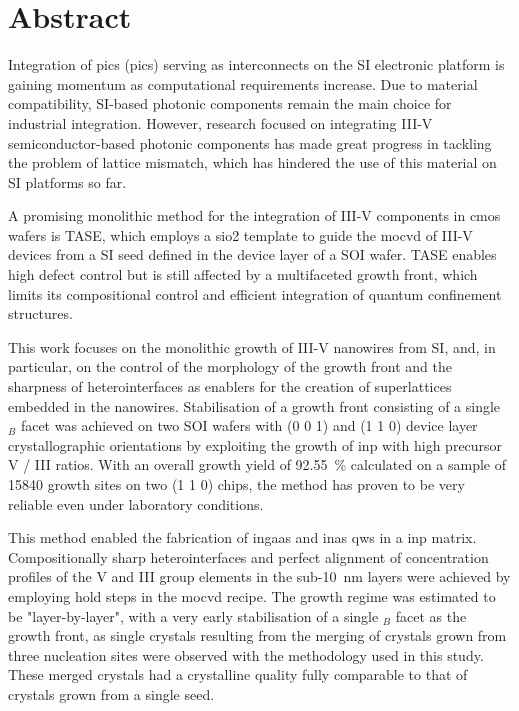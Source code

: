 \chapter{Abstract}

Integration of \acl{pic}s (\acs{pic}s) serving as interconnects on the \acl{SI} electronic platform is gaining momentum as computational requirements increase. Due to material compatibility, \acl{SI}-based photonic components remain the main choice for industrial integration. However, research focused on integrating III-V semiconductor-based photonic components has made great progress in tackling the problem of lattice mismatch, which has hindered the use of this material on \acl{SI} platforms so far.

A promising monolithic method for the integration of III-V components in \acs{cmos} wafers is \acf{TASE}, which employs a \acf{sio2} template to guide the \acf{mocvd} of III-V devices from a \acl{SI} seed defined in the device layer of a \acf{SOI} wafer. \acs{TASE} enables high defect control but is still affected by a multifaceted growth front, which limits its compositional control and efficient integration of quantum confinement structures.

This work focuses on the monolithic growth of III-V nanowires from \acl{SI}, and, in particular, on the control of the morphology of the growth front and the sharpness of heterointerfaces as enablers for the creation of superlattices embedded in the nanowires. Stabilisation of a growth front consisting of a single \(_B\) facet was achieved on two \acs{SOI} wafers with \hkl(0 0 1) and \hkl(1 1 0) device layer crystallographic orientations by exploiting the growth of \acs{inp} with high precursor V / III ratios. With an overall growth yield of \qty{92.55}{\%} calculated on a sample of \num{15840} growth sites on two \hkl(1 1 0) chips, the method has proven to be very reliable even under laboratory conditions.

This method enabled the fabrication of \acs{ingaas} and \acs{inas} \acl{qw}s in a \acs{inp} matrix. Compositionally sharp heterointerfaces and perfect alignment of concentration profiles of the V and III group elements in the sub-\qty{10}{\nano\metre} layers were achieved by employing hold steps in the \acs{mocvd} recipe. The growth regime was estimated to be "layer-by-layer", with a very early stabilisation of a single \(_B\) facet as the growth front, as single crystals resulting from the merging of crystals grown from three nucleation sites were observed with the methodology used in this study. These merged crystals had a crystalline quality fully comparable to that of crystals grown from a single seed.

